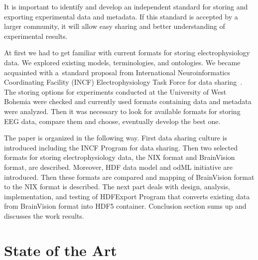 \documentclass[conference]{IEEEtran}
\begin{document}
It is important to identify and develop an independent standard for storing and exporting experimental data and metadata. If this standard is accepted by a larger community, it will allow easy sharing and better understanding of experimental results.

At first we had to get familiar with current formats for storing electrophysiology data. We explored existing models, terminologies, and ontologies. We became acquainted with a~standard proposal from International Neuroinformatics Coordinating Facility (INCF) Electrophysiology Task Force for data sharing~\cite{incfwebtaskforce}. The storing options for experiments conducted at the University of West Bohemia were checked and currently used formats containing data and metadata were analyzed. Then it was necessary to look for available formats for storing EEG data, compare them and choose, eventually develop the best one.

The paper is organized in the following way. First data sharing culture is introduced including the INCF Program for data sharing. Then two selected formats for storing electrophysiology data, the NIX format and BrainVision format, are described. Moreover, HDF data model and odML initiative are introduced. Then these formats are compared and mapping of BrainVision format to the NIX format is described. The next part deals with design, analysis, implementation, and testing of HDFExport Program that converts existing data from BrainVision format into HDF5 container. Conclusion section sums up and discusses the work results. 

\section{State of the Art}
\end{document}
